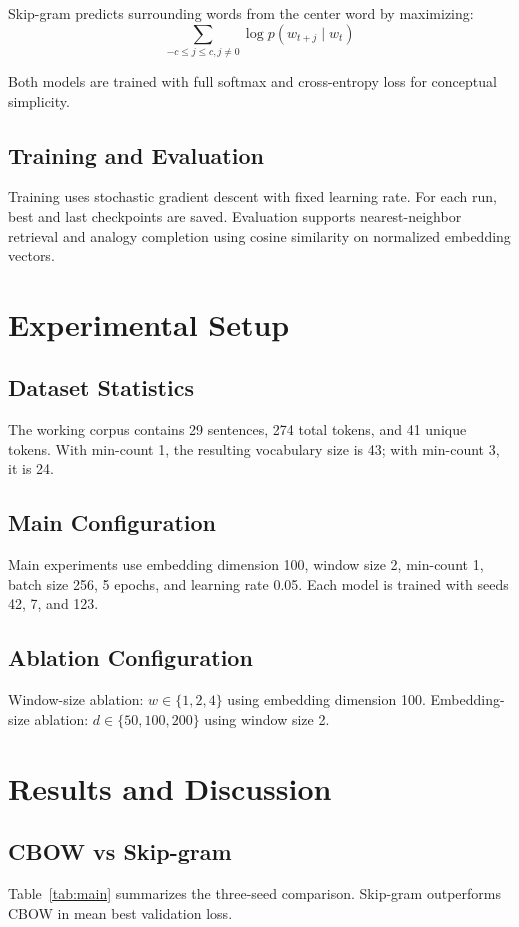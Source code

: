 \documentclass[conference]{IEEEtran}
\begin{document}
Skip-gram predicts surrounding words from the center word by maximizing:
\begin{equation}
\sum_{-c \le j \le c, j \ne 0} \log p(w_{t+j} \mid w_t)
\end{equation}

Both models are trained with full softmax and cross-entropy loss for conceptual simplicity.

\subsection{Training and Evaluation}
Training uses stochastic gradient descent with fixed learning rate. For each run, best and last checkpoints are saved. Evaluation supports nearest-neighbor retrieval and analogy completion using cosine similarity on normalized embedding vectors.

\section{Experimental Setup}
\subsection{Dataset Statistics}
The working corpus contains 29 sentences, 274 total tokens, and 41 unique tokens. With min-count 1, the resulting vocabulary size is 43; with min-count 3, it is 24.

\subsection{Main Configuration}
Main experiments use embedding dimension 100, window size 2, min-count 1, batch size 256, 5 epochs, and learning rate 0.05. Each model is trained with seeds 42, 7, and 123.

\subsection{Ablation Configuration}
Window-size ablation: $w \in \{1,2,4\}$ using embedding dimension 100. 
Embedding-size ablation: $d \in \{50,100,200\}$ using window size 2.

\section{Results and Discussion}
\subsection{CBOW vs Skip-gram}
Table~\ref{tab:main} summarizes the three-seed comparison. Skip-gram outperforms CBOW in mean best validation loss.
\end{document}

